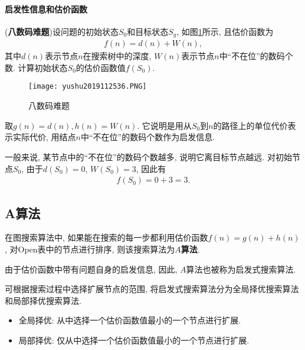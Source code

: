 \paragraph{启发性信息和估价函数}
\begin{example}\label{AI32C4exam08}
(\textbf{八数码难题})设问题的初始状态$S_0$和目标状态$S_g$, 如图\ref{AI32fig2019120134}所示, 且估价函数为
\begin{align}
    f(n)=d(n)+W(n),
\end{align}
其中$d(n)$表示节点$n$在搜索树中的深度, $W(n)$表示节点$n$中“不在位”的数码个数. 计算初始状态$S_0$的估价函数值$f(S_0)$.
\end{example}
\begin{figure}[H]
\centering
\texttt{[image: yushu2019112536.PNG]}
\caption{八数码难题}
\label{AI32fig2019120134}
\end{figure}
\begin{result}
取$g(n)=d(n), h(n)=W(n)$. 它说明是用从$S_0$到$n$的路径上的单位代价表示实际代价, 用结点$n$中“不在位”的数码个数作为启发信息.

一般来说, 某节点中的“不在位”的数码个数越多, 说明它离目标节点越远.
对初始节点$S_0$, 由于$d(S_0)=0$, $W(S_0)=3$, 因此有
\begin{align}
    f(S_0)=0+3=3.
\end{align}
\end{result}
\subsection{A算法}
在图搜索算法中, 如果能在搜索的每一步都利用估价函数$f(n)=g(n)+h(n)$, 对Open表中的节点进行排序, 则该搜索算法为\textbf{$A$算法}.
\begin{remark}
  由于估价函数中带有问题自身的启发信息, 因此, $A$算法也被称为启发式搜索算法.
\end{remark}
\begin{remark}
    可根据搜索过程中选择扩展节点的范围, 将启发式搜索算法分为全局择优搜索算法和局部择优搜索算法.
\end{remark}

\begin{itemize}
	\item \textcolor[rgb]{0,0,1}{全局择优}:  从中选择一个估价函数值最小的一个节点进行扩展.
	\item \textcolor[rgb]{0,0,1}{局部择优}: 仅从中选择一个估价函数值最小的一个节点进行扩展.
\end{itemize}

